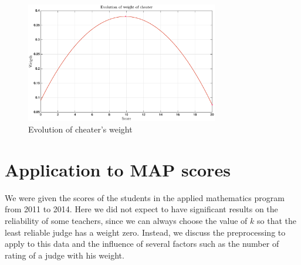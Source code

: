 \documentclass[12pt,a4paper]{article}
\begin{document}
\begin{figure}[h!]
\centering
\includegraphics[width = 0.75\textwidth]{cheaters/evolution_cheater_weight.eps}
\caption{Evolution of cheater's weight}
\label{fig:howto_weight}
\end{figure}

\section{Application to MAP scores}
We were given the scores of the students in the applied mathematics program from 2011 to 2014. Here we did not expect to have significant results on the reliability of some teachers, since we can always choose the value of $k$ so that the least reliable judge has a weight zero. Instead, we discuss the preprocessing to apply to this data and the influence of several factors such as the number of rating of a judge with his weight.


\FloatBarrier
\end{document}
